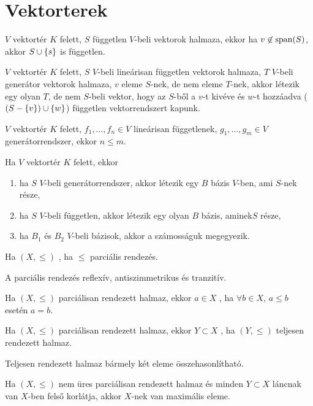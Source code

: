 \section{Vektorterek}
\begin{tet}
	$V$ vektortér $K$ felett, $S$ független $V$-beli vektorok halmaza,
	ekkor ha $v\not\in\operatorname{span}(S)$, akkor $S\cup\{s\}$ is független.
\end{tet}
\begin{mm}
	$V$ vektortér $K$ felett, $S$ $V$-beli lineárisan független vektorok
	halmaza, $T$ $V$-beli generátor vektorok halmaza, $v$ eleme $S$-nek, de nem
	eleme $T$-nek, akkor létezik egy olyan $T$, de nem $S$-beli vektor, hogy az
	$S$-ből a $v$-t kivéve és $w$-t hozzáadva ($(S-\{v\})\cup\{w\}$) független
	vektorrendszert kapunk.
\end{mm}
\begin{mm}
	$V$ vektortér $K$ felett, $f_1,\ldots,f_n\in V$ lineárisan függetlenek,
	$g_1,\ldots,g_m\in V$ generátorrendszer, ekkor $n\leq m$.
\end{mm}
\begin{tet}
	Ha $V$ vektortér $K$ felett, ekkor
	\begin{enumerate}
		\item ha $S$ $V$-beli generátorrendszer, akkor létezik egy $B$ bázis
			$V$-ben, ami $S$-nek része,
		\item ha $S$ $V$-beli független, akkor létezik egy olyan $B$ bázis,
			aminek$S$ része,
		\item ha $B_1$ és $B_2$ $V$-beli bázisok, akkor a számosságuk megegyezik.
	\end{enumerate}
\end{tet}
\begin{ff}
	Ha $(X,\leq)$ , ha $\leq$ parciális
	rendezés.
\end{ff}
\begin{megj}
	A parciális rendezés reflexív, antiszimmetrikus és tranzitív.
\end{megj}
\begin{ff}
	Ha $(X,\leq)$ parciálisan rendezett halmaz, ekkor $a\in X$
	, ha $\forall b\in X$, $a\leq b$ esetén $a=b$.
\end{ff}
\begin{ff}
	Ha $(X,\leq)$ parciálisan rendezett halmaz, ekkor $Y\subset X$ ,
	ha $(Y,\leq)$ teljesen rendezett halmaz.
\end{ff}
\begin{megj}
	Teljesen rendezett halmaz bármely két eleme összehasonlítható.
\end{megj}
\begin{mm}[Zorn]
	Ha $(X,\leq)$ nem üres parciálisan rendezett halmaz és minden $Y\subset
	X$ láncnak van $X$-ben felső korlátja, akkor $X$-nek van maximális
	eleme.
\end{mm}

